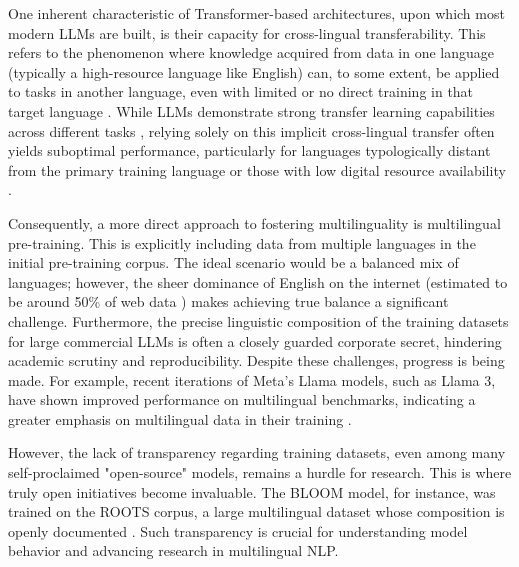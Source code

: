 One inherent characteristic of Transformer-based architectures, upon which most modern LLMs are built, is their capacity for cross-lingual transferability. This refers to the phenomenon where knowledge acquired from data in one language (typically a high-resource language like English) can, to some extent, be applied to tasks in another language, even with limited or no direct training in that target language \cite{artetxe2019massively, cross_lingual_transfer}. While LLMs demonstrate strong transfer learning capabilities across different tasks \cite{brown2020languagemodelsfewshotlearners}, relying solely on this implicit cross-lingual transfer often yields suboptimal performance, particularly for languages typologically distant from the primary training language or those with low digital resource availability \cite{singh2024threeprongedapproachcrosslingualadaptation, adelani2021effect}.

Consequently, a more direct approach to fostering multilinguality is multilingual pre-training. 
This is explicitly including data from multiple languages in the initial pre-training corpus. The ideal scenario would be a balanced mix of languages; however, the sheer dominance of English on the internet (estimated to be around 50\% of web data \cite{Petrosyan2025CommonLanguages}) makes achieving true balance a significant challenge. Furthermore, the precise linguistic composition of the training datasets for large commercial LLMs is often a closely guarded corporate secret, hindering academic scrutiny and reproducibility. Despite these challenges, progress is being made. For example, recent iterations of Meta's Llama models, such as Llama 3, have shown improved performance on multilingual benchmarks, indicating a greater emphasis on multilingual data in their training \cite{grattafiori2024llama3herdmodels}.

However, the lack of transparency regarding training datasets, even among many self-proclaimed "open-source" models, remains a hurdle for research. This is where truly open initiatives become invaluable. The BLOOM model, for instance, was trained on the ROOTS corpus, a large multilingual dataset whose composition is openly documented \cite{scao:hal-03850124, laurençon2023bigsciencerootscorpus16tb}. Such transparency is crucial for understanding model behavior and advancing research in multilingual NLP.

